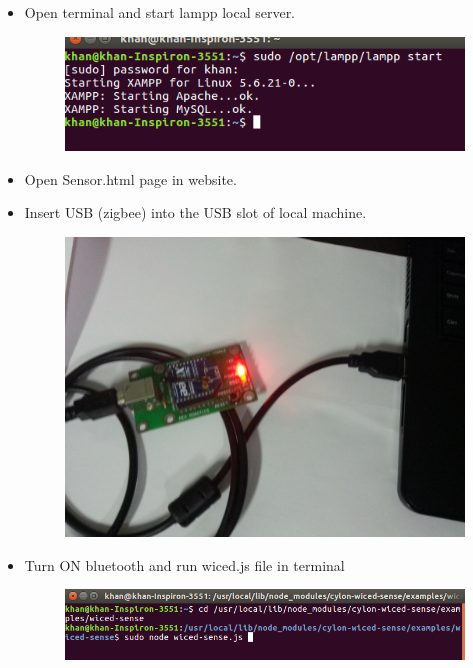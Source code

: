 \documentclass[11pt,a4paper]{article}
\begin{document}
	 \begin{itemize}
	 \item Open terminal and start lampp local server.
	 
	 	\begin{figure}[h]
    \centering
	\includegraphics[scale=0.5]{lampstart.png}
	\end{figure}
	 
	 \item Open Sensor.html page in website.
	 \item Insert USB (zigbee) into the USB slot of local machine.
	 
	 \begin{figure}[h]
        \centering
	    \includegraphics[scale=0.1]{20160722_194935.jpg}
	\end{figure}
	 
	 \item Turn ON bluetooth and run wiced.js file in terminal
	 
	 \begin{figure}[h]
    \centering
	\includegraphics[scale=0.5]{runwicedjs.png}
	\end{figure}


\end{itemize}
\end{document}
